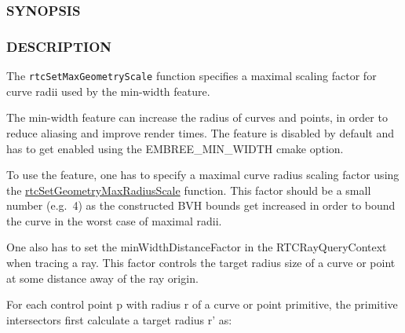 \begin{Shaded}
\begin{Highlighting}[]
\OperatorTok{{-}}\OperatorTok{{-}}
\end{Highlighting}
\end{Shaded}

\subsubsection{SYNOPSIS}\label{synopsis}

\begin{Shaded}
\begin{Highlighting}[]

\OperatorTok{(}\OperatorTok{,} \OperatorTok{);}
\end{Highlighting}
\end{Shaded}

\subsubsection{DESCRIPTION}\label{description}

The \texttt{rtcSetMaxGeometryScale} function specifies a maximal scaling
factor for curve radii used by the min-width feature.

The min-width feature can increase the radius of curves and points, in
order to reduce aliasing and improve render times. The feature is
disabled by default and has to get enabled using the EMBREE\_MIN\_WIDTH
cmake option.

To use the feature, one has to specify a maximal curve radius scaling
factor using the
\hyperref[rtcsetgeometrymaxradiusscale]{rtcSetGeometryMaxRadiusScale}
function. This factor should be a small number (e.g.~4) as the
constructed BVH bounds get increased in order to bound the curve in the
worst case of maximal radii.

One also has to set the minWidthDistanceFactor in the RTCRayQueryContext
when tracing a ray. This factor controls the target radius size of a
curve or point at some distance away of the ray origin.

For each control point p with radius r of a curve or point primitive,
the primitive intersectors first calculate a target radius r' as:

